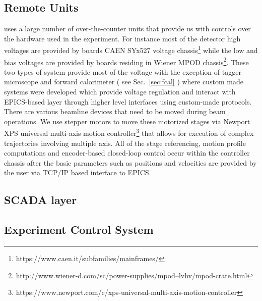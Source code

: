 \subsection{Remote Units \label{sec:controlsinterface}}
\gx{} uses a large number of over-the-counter units that provide us with controls over the hardware used in the experiment. For instance most of the detector high voltages are provided by boards CAEN SYx527 voltage chassis\footnote{https://www.caen.it/subfamilies/mainframes/} while the low and bias voltages are provided by boards residing in Wiener MPOD chassis\footnote{http://www.wiener-d.com/sc/power-supplies/mpod--lvhv/mpod-crate.html}. These two types of system provide most of the voltage with the exception of tagger microscope and forward calorimeter ( see Sec.~\ref{sec:fcal} ) where custom made systems were developed which provide voltage regulation and interact with EPICS-based layer through higher level interfaces using custom-made protocols.  
There are various beamline devices that need to be moved during beam operations. We use stepper motors to move these motorized stages via Newport XPS universal multi-axis motion controller\footnote{https://www.newport.com/c/xps-universal-multi-axis-motion-controller} that allows for execution of complex trajectories involving multiple axis. All of the stage referencing, motion profile computations and encoder-based closed-loop control occur within the controller chassis after the basic parameters such as positions and velocities are provided by the user via TCP/IP based interface to EPICS.   
\subsection{SCADA layer \label{sec:archiver}}
\subsection{Experiment Control System \label{sec:alarms}}
